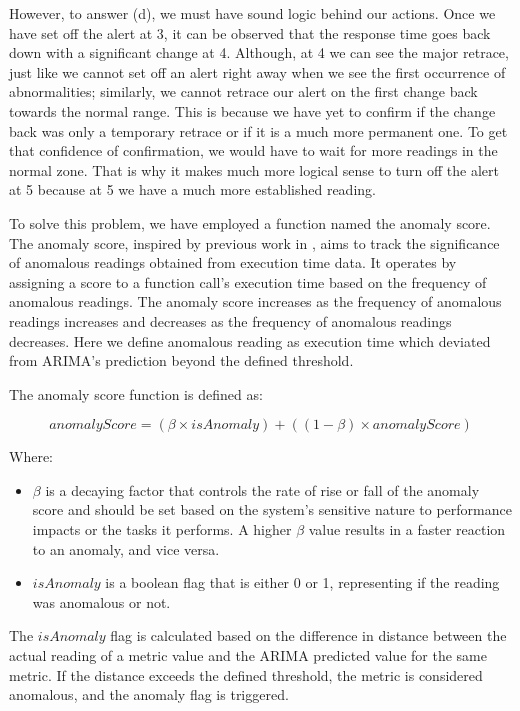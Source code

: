 \documentclass[pdflatex,sn-nature]{sn-jnl}%
\theoremstyle{thmstyleone}%
\theoremstyle{thmstyletwo}%
\theoremstyle{thmstylethree}%
\begin{document}
However, to answer (d), we must have sound logic behind our actions. Once we have set off the alert at 3, it can be observed that the response time goes back down with a significant change at 4. Although, at 4 we can see the major retrace, just like we cannot set off an alert right away when we see the first occurrence of abnormalities; similarly, we cannot retrace our alert on the first change back towards the normal range. This is because we have yet to confirm if the change back was only a temporary retrace or if it is a much more permanent one. To get that confidence of confirmation, we would have to wait for more readings in the normal zone. That is why it makes much more logical sense to turn off the alert at 5 because at 5 we have a much more established reading.

To solve this problem, we have employed a function named the anomaly score. The anomaly score, inspired by previous work in \cite{ehlers2011self}, aims to track the significance of anomalous readings obtained from execution time data. It operates by assigning a score to a function call's execution time based on the frequency of anomalous readings. The anomaly score increases as the frequency of anomalous readings increases and decreases as the frequency of anomalous readings decreases. Here we define anomalous reading as execution time which deviated from ARIMA's prediction beyond the defined threshold.

The anomaly score function is defined as:

\begin{equation}
anomalyScore = (\beta \times isAnomaly) + ((1 - \beta) \times anomalyScore)
\end{equation}

Where:

\begin{itemize}
  \item $\beta$ is a decaying factor that controls the rate of rise or fall of the anomaly score and should be set based on the system's sensitive nature to performance impacts or the tasks it performs. A higher $\beta$ value results in a faster reaction to an anomaly, and vice versa.
  \item $isAnomaly$ is a boolean flag that is either 0 or 1, representing if the reading was anomalous or not.
\end{itemize}

The $isAnomaly$ flag is calculated based on the difference in distance between the actual reading of a metric value and the ARIMA predicted value for the same metric. If the distance exceeds the defined threshold, the metric is considered anomalous, and the anomaly flag is triggered.
\end{document}

